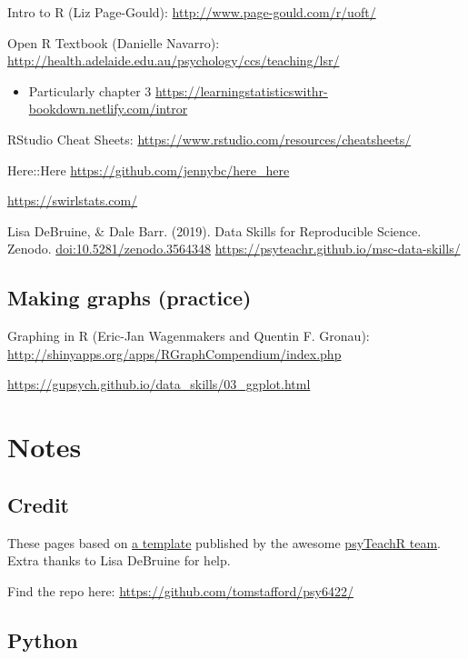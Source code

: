\documentclass[]{book}
\providecommand{\tightlist}{%
  \setlength{\itemsep}{0pt}\setlength{\parskip}{0pt}}
\begin{document}
Intro to R (Liz Page-Gould): \url{http://www.page-gould.com/r/uoft/}

Open R Textbook (Danielle Navarro):
\url{http://health.adelaide.edu.au/psychology/ccs/teaching/lsr/}

\begin{itemize}
\tightlist
\item
  Particularly chapter 3
  \url{https://learningstatisticswithr-bookdown.netlify.com/intror}
\end{itemize}

RStudio Cheat Sheets:
\url{https://www.rstudio.com/resources/cheatsheets/}

Here::Here \url{https://github.com/jennybc/here_here}

\url{https://swirlstats.com/}

Lisa DeBruine, \& Dale Barr. (2019). Data Skills for Reproducible
Science. Zenodo. \url{doi:10.5281/zenodo.3564348}
\url{https://psyteachr.github.io/msc-data-skills/}

\section{Making graphs (practice)}\label{making-graphs-practice}

Graphing in R (Eric-Jan Wagenmakers and Quentin F. Gronau):
\url{http://shinyapps.org/apps/RGraphCompendium/index.php}

\url{https://gupsych.github.io/data_skills/03_ggplot.html}

\chapter{Notes}\label{notes}

\section{Credit}\label{credit}

These pages based on \href{https://psyteachr.github.io/book-template/}{a
template} published by the awesome
\href{https://psyteachr.github.io/about/}{psyTeachR team}. Extra thanks
to Lisa DeBruine for help.

Find the repo here: \url{https://github.com/tomstafford/psy6422/}

\section{Python}\label{python}
\end{document}
